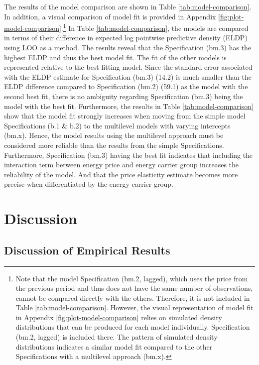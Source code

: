 \documentclass[12pt,twoside]{reedthesis}
\begin{document}
The results of the model comparison are shown in Table \ref{tab:model-comparison}. In addition, a visual comparison of model fit is provided in Appendix \ref{fig:plot-model-comparison}.\footnote{Note that the model Specification (bm.2, lagged), which uses the price from the previous period and thus does not have the same number of observations, cannot be compared directly with the others. Therefore, it is not included in Table \ref{tab:model-comparison}. However, the visual representation of model fit in Appendix \ref{fig:plot-model-comparison} relies on simulated density distributions that can be produced for each model individually. Specification (bm.2, lagged) is included there. The pattern of simulated density distributions indicates a similar model fit compared to the other Specifications with a multilevel approach (bm.x).} In Table \ref{tab:model-comparison}, the models are compared in terms of their difference in expected log pointwise predictive density (ELDP) using LOO as a method. The results reveal that the Specification (bm.3) has the highest ELDP and thus the best model fit. The fit of the other models is represented relative to the best fitting model. Since the standard error associated with the ELDP estimate for Specification (bm.3) (14.2) is much smaller than the ELDP difference compared to Specification (bm.2) (59.1) as the model with the second best fit, there is no ambiguity regarding Specification (bm.3) being the model with the best fit. Furthermore, the results in Table \ref{tab:model-comparison} show that the model fit strongly increases when moving from the simple model Specifications (b.1 \& b.2) to the multilevel models with varying intercepts (bm.x). Hence, the model results using the multilevel approach must be considered more reliable than the results from the simple Specifications. Furthermore, Specification (bm.3) having the best fit indicates that including the interaction term between energy price and energy carrier group increases the reliability of the model. And that the price elasticity estimate becomes more precise when differentiated by the energy carrier group.

\hypertarget{discussion}{%
\chapter{Discussion}\label{discussion}}

\hypertarget{discussion-results}{%
\section{Discussion of Empirical Results}\label{discussion-results}}
\end{document}

